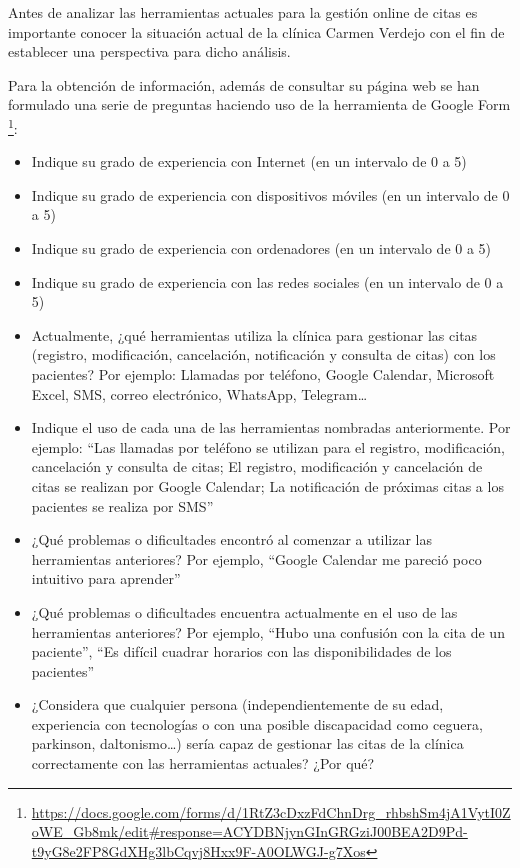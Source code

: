 Antes de analizar las herramientas actuales para la gestión online de citas es importante conocer la situación actual de la clínica Carmen Verdejo con el fin de establecer una perspectiva para dicho análisis.\bigskip

Para la obtención de información, además de consultar su página web se han formulado una serie de preguntas haciendo uso de la herramienta de Google Form \footnote{\url{https://docs.google.com/forms/d/1RtZ3cDxzFdChnDrg_rhbshSm4jA1VytI0ZoWE_Gb8mk/edit#response=ACYDBNjynGInGRGziJ00BEA2D9Pd-t9yG8e2FP8GdXHg3lbCqvj8Hxx9F-A0OLWGJ-g7Xos}}: \bigskip

\begin{itemize}
    \item Indique su grado de experiencia con Internet (en un intervalo de 0 a 5)
    \item Indique su grado de experiencia con dispositivos móviles (en un intervalo de 0 a 5)
    \item Indique su grado de experiencia con ordenadores (en un intervalo de 0 a 5)
    \item Indique su grado de experiencia con las redes sociales (en un intervalo de 0 a 5)
    \item Actualmente, ¿qué herramientas utiliza la clínica para gestionar las citas (registro, modificación, cancelación, notificación y consulta de citas) con los pacientes? Por ejemplo: Llamadas por teléfono, Google Calendar, Microsoft Excel, SMS, correo electrónico, WhatsApp, Telegram… 
    \item Indique el uso de cada una de las herramientas nombradas anteriormente. Por ejemplo: “Las llamadas por teléfono se utilizan para el registro, modificación, cancelación y consulta de citas; El registro, modificación y cancelación de citas se realizan por Google Calendar; La notificación de próximas citas a los pacientes se realiza por SMS”
    \item ¿Qué problemas o dificultades encontró al comenzar a utilizar las herramientas anteriores? Por ejemplo, “Google Calendar me pareció poco intuitivo para aprender”
    \item ¿Qué problemas o dificultades encuentra actualmente en el uso de las herramientas anteriores? Por ejemplo, “Hubo una confusión con la cita de un paciente”, “Es difícil cuadrar horarios con las disponibilidades de los pacientes”
    \item ¿Considera que cualquier persona (independientemente de su edad, experiencia con tecnologías o con una posible discapacidad como ceguera, parkinson, daltonismo…) sería capaz de gestionar las citas de la clínica correctamente con las herramientas actuales? ¿Por qué?

\end{itemize}
